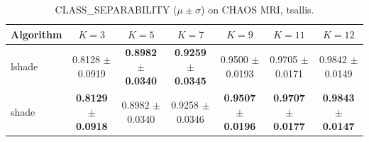 \begin{table}[htbp]
\centering
\caption{CLASS_SEPARABILITY ($\mu \pm \sigma$) on CHAOS MRI, tsallis.}
\label{tab:exp2-tsallis-class_separability}
\begin{tabular}{lcccccc}
\toprule
Algorithm & $K=3$ & $K=5$ & $K=7$ & $K=9$ & $K=11$ & $K=12$ \\
\midrule
lshade & 0.8128 $\pm$ 0.0919 & \textbf{0.8982 $\pm$ 0.0340} & \textbf{0.9259 $\pm$ 0.0345} & 0.9500 $\pm$ 0.0193 & 0.9705 $\pm$ 0.0171 & 0.9842 $\pm$ 0.0149 \\
shade & \textbf{0.8129 $\pm$ 0.0918} & 0.8982 $\pm$ 0.0340 & 0.9258 $\pm$ 0.0346 & \textbf{0.9507 $\pm$ 0.0196} & \textbf{0.9707 $\pm$ 0.0177} & \textbf{0.9843 $\pm$ 0.0147} \\
\bottomrule
\end{tabular}
\end{table}